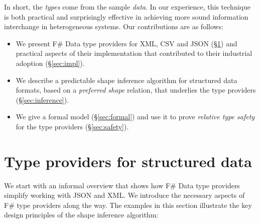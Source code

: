 \documentclass[10pt]{sigplanconf}
\begin{document}
In short, the \emph{types} come from the sample \emph{data}. In our experience, this technique is 
both practical and surprisingly effective in achieving more sound information interchange 
in heterogeneous systems. Our contributions are as follows:

\begin{itemize}
\item We present F\# Data type providers for XML, CSV and JSON (\S\ref{sec:providers}) 
  and practical aspects of their implementation that contributed to their industrial 
  adoption (\S\ref{sec:impl}). 

\item We describe a predictable shape inference algorithm for structured data formats, 
  based on a \emph{preferred shape} relation, that underlies the type providers 
  (\S\ref{sec:inference}).

\item We give a formal model (\S\ref{sec:formal}) and use it to prove
  \emph{relative type safety} for the type providers (\S\ref{sec:safety}).
\end{itemize}



%
%

\section{Type providers for structured data}
\label{sec:providers}

We start with an informal overview that shows how F\# Data type providers simplify working with 
JSON and XML. We introduce the necessary aspects of F\# type providers along the way. The examples 
in this section illustrate the key design principles of the shape inference algorithm:
\end{document}
